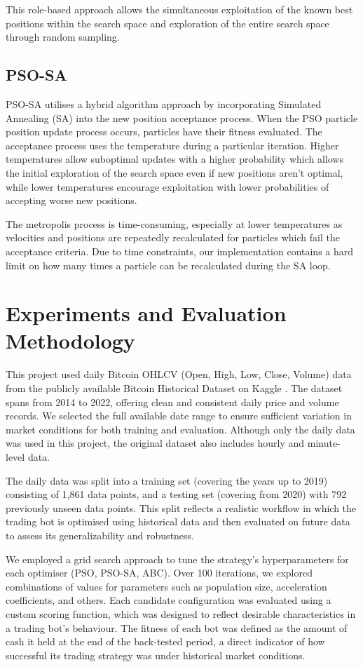 \documentclass[a4paper, 12pt]{extarticle}
\begin{document}
This role-based approach allows the simultaneous exploitation of the known best positions within the search space and exploration of the entire search space through random sampling. 

\subsection{PSO-SA} 
PSO-SA utilises a hybrid algorithm approach by incorporating Simulated Annealing (SA) into the new position acceptance process. When the PSO particle position update process occurs, particles have their fitness evaluated. The acceptance process uses the temperature during a particular iteration. Higher temperatures allow suboptimal updates with a higher probability which allows the initial exploration of the search space even if new positions aren't optimal, while lower temperatures encourage exploitation with lower probabilities of accepting worse new positions.   

The metropolis process is time-consuming, especially at lower temperatures as velocities and positions are repeatedly recalculated for particles which fail the acceptance criteria. Due to time constraints, our implementation contains a hard limit on how many times a particle can be recalculated during the SA loop. 

\section{Experiments and Evaluation Methodology}

This project used daily Bitcoin OHLCV (Open, High, Low, Close, Volume) data from the publicly available Bitcoin Historical Dataset on Kaggle \cite{kaggle}. The dataset spans from 2014 to 2022, offering clean and consistent daily price and volume records. We selected the full available date range to ensure sufficient variation in market conditions for both training and evaluation. Although only the daily data was used in this project, the original dataset \cite{kaggle} also includes hourly and minute-level data. 

The daily data was split into a training set (covering the years up to 2019) consisting of 1,861 data points, and a testing set (covering from 2020) with 792 previously unseen data points. This split reflects a realistic workflow in which the trading bot is optimised using historical data and then evaluated on future data to assess its generalizability and robustness. 

We employed a grid search approach to tune the strategy's hyperparameters for each optimiser (PSO, PSO-SA, ABC). Over 100 iterations, we explored combinations of values for parameters such as population size, acceleration coefficients, and others. Each candidate configuration was evaluated using a custom scoring function, which was designed to reflect desirable characteristics in a trading bot's behaviour.
The fitness of each bot was defined as the amount of cash it held at the end of the back-tested period, a direct indicator of how successful its trading strategy was under historical market conditions.
\end{document}
